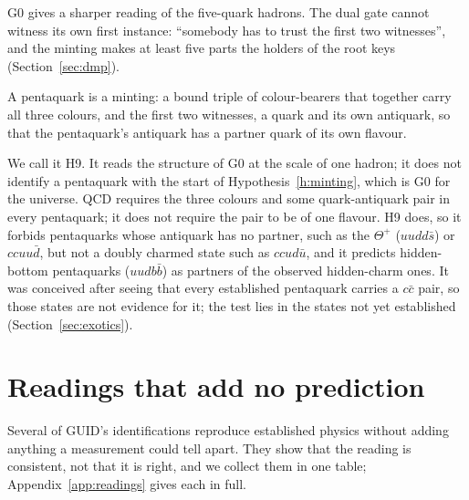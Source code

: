 G0 gives a sharper reading of the five-quark hadrons. The dual gate cannot witness its own first instance: ``somebody has to trust the
first two witnesses'', and the minting makes at least five parts the holders of the root keys (Section~\ref{sec:dmp}).

\begin{hypothesis}\label{h:mint}
A pentaquark is a minting: a bound triple of colour-bearers that together carry all three colours, and the first two witnesses, a quark
and its own antiquark, so that the pentaquark's antiquark has a partner quark of its own flavour. \tagH
\end{hypothesis}

\noindent We call it H9. It reads the structure of G0 at the scale of one hadron; it does not identify a pentaquark with the start of
Hypothesis~\ref{h:minting}, which is G0 for the universe. QCD requires the three colours and some quark-antiquark pair in every pentaquark; it does not require the pair
to be of one flavour. H9 does, so it forbids pentaquarks whose antiquark has no partner, such as the $\Theta^+$ ($uudd\bar s$) or
$ccuu\bar d$, but not a doubly charmed state such as $ccud\bar u$, and it predicts hidden-bottom pentaquarks ($uudb\bar b$) as partners of
the observed hidden-charm ones. It was conceived after seeing that every established
pentaquark carries a $c\bar c$ pair, so those states are not evidence for it; the test lies in the states not yet established
(Section~\ref{sec:exotics}).

\section{Readings that add no prediction}\label{sec:readings}

Several of GUID's identifications reproduce established physics without adding anything a measurement could tell apart. They show that
the reading is consistent, not that it is right, and we collect them in one table; Appendix~\ref{app:readings} gives each in full.


